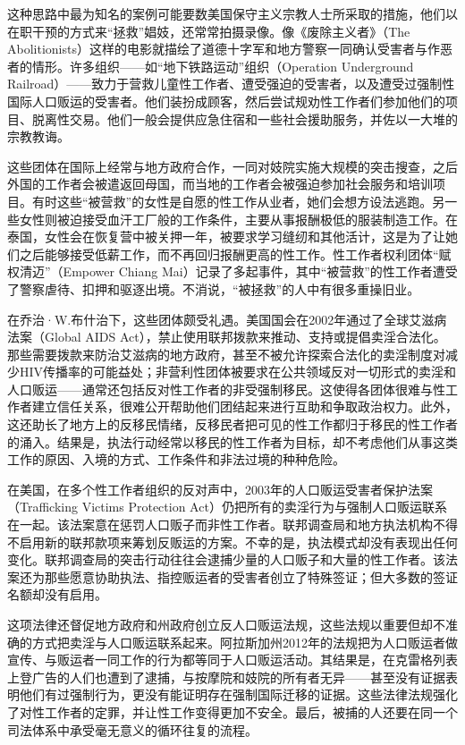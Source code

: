 \documentclass[fontset=fandol, a4paper, 12pt, openright]{ctexbook}
\begin{document}
这种思路中最为知名的案例可能要数美国保守主义宗教人士所采取的措施，他们以在职干预的方式来“拯救”娼妓，还常常拍摄录像。像《废除主义者》（The Abolitionists）这样的电影就描绘了道德十字军和地方警察一同确认受害者与作恶者的情形。许多组织——如“地下铁路运动”组织（Operation Underground Railroad）——致力于营救儿童性工作者、遭受强迫的受害者，以及遭受过强制性国际人口贩运的受害者。他们装扮成顾客，然后尝试规劝性工作者们参加他们的项目、脱离性交易。他们一般会提供应急住宿和一些社会援助服务，并佐以一大堆的宗教教诲。

这些团体在国际上经常与地方政府合作，一同对妓院实施大规模的突击搜查，之后外国的工作者会被遣返回母国，而当地的工作者会被强迫参加社会服务和培训项目。有时这些“被营救”的女性是自愿的性工作从业者，她们会想方设法逃跑。另一些女性则被迫接受血汗工厂般的工作条件，主要从事报酬极低的服装制造工作。在泰国，女性会在恢复营中被关押一年，被要求学习缝纫和其他活计，这是为了让她们之后能够接受低薪工作，而不再回归报酬更高的性工作。性工作者权利团体“赋权清迈”（Empower Chiang Mai）记录了多起事件，其中“被营救”的性工作者遭受了警察虐待、扣押和驱逐出境。不消说，“被拯救”的人中有很多重操旧业。

在乔治·W.布什治下，这些团体颇受礼遇。美国国会在2002年通过了全球艾滋病法案（Global AIDS Act），禁止使用联邦拨款来推动、支持或提倡卖淫合法化。那些需要拨款来防治艾滋病的地方政府，甚至不被允许探索合法化的卖淫制度对减少HIV传播率的可能益处；非营利性团体被要求在公共领域反对一切形式的卖淫和人口贩运——通常还包括反对性工作者的非受强制移民。这使得各团体很难与性工作者建立信任关系，很难公开帮助他们团结起来进行互助和争取政治权力。此外，这还助长了地方上的反移民情绪，反移民者把可见的性工作都归于移民的性工作者的涌入。结果是，执法行动经常以移民的性工作者为目标，却不考虑他们从事这类工作的原因、入境的方式、工作条件和非法过境的种种危险。

在美国，在多个性工作者组织的反对声中，2003年的人口贩运受害者保护法案（Trafficking Victims Protection Act）仍把所有的卖淫行为与强制人口贩运联系在一起。该法案意在惩罚人口贩子而非性工作者。联邦调查局和地方执法机构不得不启用新的联邦款项来筹划反贩运的方案。不幸的是，执法模式却没有表现出任何变化。联邦调查局的突击行动往往会逮捕少量的人口贩子和大量的性工作者。该法案还为那些愿意协助执法、指控贩运者的受害者创立了特殊签证；但大多数的签证名额却没有启用。

这项法律还督促地方政府和州政府创立反人口贩运法规，这些法规以重要但却不准确的方式把卖淫与人口贩运联系起来。阿拉斯加州2012年的法规把为人口贩运者做宣传、与贩运者一同工作的行为都等同于人口贩运活动。其结果是，在克雷格列表上登广告的人们也遭到了逮捕，与按摩院和妓院的所有者无异——甚至没有证据表明他们有过强制行为，更没有能证明存在强制国际迁移的证据。这些法律法规强化了对性工作者的定罪，并让性工作变得更加不安全。最后，被捕的人还要在同一个司法体系中承受毫无意义的循环往复的流程。
\end{document}
